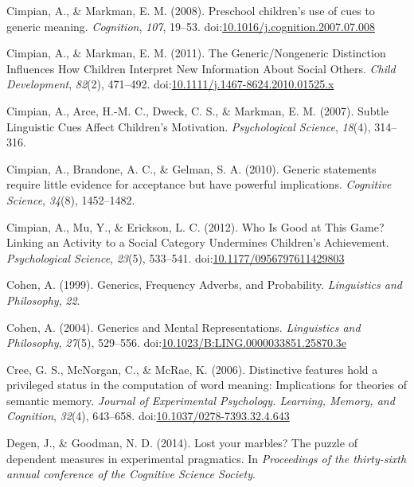 \documentclass[english,floatsintext,man]{apa6}
\theoremstyle{definition}
\theoremstyle{definition}
\theoremstyle{definition}
\theoremstyle{remark}
\begin{document}
\hypertarget{ref-Cimpian2008}{}
Cimpian, A., \& Markman, E. M. (2008). Preschool children's use of cues
to generic meaning. \emph{Cognition}, \emph{107}, 19--53.
doi:\href{https://doi.org/10.1016/j.cognition.2007.07.008}{10.1016/j.cognition.2007.07.008}

\hypertarget{ref-Cimpian2011a}{}
Cimpian, A., \& Markman, E. M. (2011). The Generic/Nongeneric
Distinction Influences How Children Interpret New Information About
Social Others. \emph{Child Development}, \emph{82}(2), 471--492.
doi:\href{https://doi.org/10.1111/j.1467-8624.2010.01525.x}{10.1111/j.1467-8624.2010.01525.x}

\hypertarget{ref-Cimpian2007}{}
Cimpian, A., Arce, H.-M. C., Dweck, C. S., \& Markman, E. M. (2007).
Subtle Linguistic Cues Affect Children's Motivation. \emph{Psychological
Science}, \emph{18}(4), 314--316.

\hypertarget{ref-Cimpian2010}{}
Cimpian, A., Brandone, A. C., \& Gelman, S. A. (2010). Generic
statements require little evidence for acceptance but have powerful
implications. \emph{Cognitive Science}, \emph{34}(8), 1452--1482.

\hypertarget{ref-Cimpian2012b}{}
Cimpian, A., Mu, Y., \& Erickson, L. C. (2012). Who Is Good at This
Game? Linking an Activity to a Social Category Undermines Children's
Achievement. \emph{Psychological Science}, \emph{23}(5), 533--541.
doi:\href{https://doi.org/10.1177/0956797611429803}{10.1177/0956797611429803}

\hypertarget{ref-Cohen1999}{}
Cohen, A. (1999). Generics, Frequency Adverbs, and Probability.
\emph{Linguistics and Philosophy}, \emph{22}.

\hypertarget{ref-Cohen2004}{}
Cohen, A. (2004). Generics and Mental Representations. \emph{Linguistics
and Philosophy}, \emph{27}(5), 529--556.
doi:\href{https://doi.org/10.1023/B:LING.0000033851.25870.3e}{10.1023/B:LING.0000033851.25870.3e}

\hypertarget{ref-Cree2006}{}
Cree, G. S., McNorgan, C., \& McRae, K. (2006). Distinctive features
hold a privileged status in the computation of word meaning:
Implications for theories of semantic memory. \emph{Journal of
Experimental Psychology. Learning, Memory, and Cognition}, \emph{32}(4),
643--658.
doi:\href{https://doi.org/10.1037/0278-7393.32.4.643}{10.1037/0278-7393.32.4.643}

\hypertarget{ref-Degen2014}{}
Degen, J., \& Goodman, N. D. (2014). Lost your marbles? The puzzle of
dependent measures in experimental pragmatics. In \emph{Proceedings of
the thirty-sixth annual conference of the Cognitive Science Society}.
\end{document}
